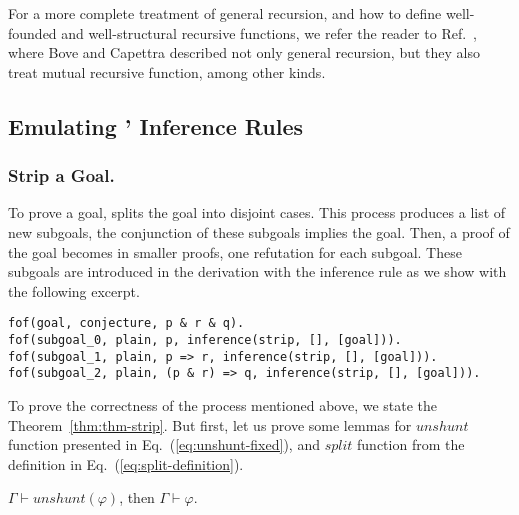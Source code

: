 \documentclass[../main.tex]{subfiles}
\begin{document}
For a more complete treatment of general recursion, and how to
define well-founded and well-structural recursive functions, we refer
the reader to Ref.~\cite{Bove2005}, where Bove and Capettra described
not only general recursion, but they also treat mutual recursive
function, among other kinds.


\subsection{Emulating \Metis' Inference Rules}
\label{ssec:emulating-inferences}

\subsubsection{Strip a Goal.}
\label{sssec:strip-a-goal}

To prove a goal, \Metis splits the goal into
disjoint cases. This process produces a list of new subgoals, the
conjunction of these subgoals implies the goal. Then, a proof of the
goal becomes in smaller proofs, one refutation for each subgoal.
These subgoals are introduced in the \TSTP derivation with the \strip
inference rule as we show with the following excerpt.

\begin{verbatim}
fof(goal, conjecture, p & r & q).
fof(subgoal_0, plain, p, inference(strip, [], [goal])).
fof(subgoal_1, plain, p => r, inference(strip, [], [goal])).
fof(subgoal_2, plain, (p & r) => q, inference(strip, [], [goal])).
\end{verbatim}

To prove the correctness of the process mentioned above, we state
the Theorem~\ref{thm:thm-strip}. But first, let us prove some
lemmas for $unshunt$ function presented in Eq.~(\ref{eq:unshunt-fixed}),
and $split$ function from the definition in Eq.~(\ref{eq:split-definition}).

\begin{lemma}
  \label{lem:unshunt}
  $Γ ⊢ unshunt(φ)$, then $Γ ⊢ φ$.
\end{lemma}
\end{document}
